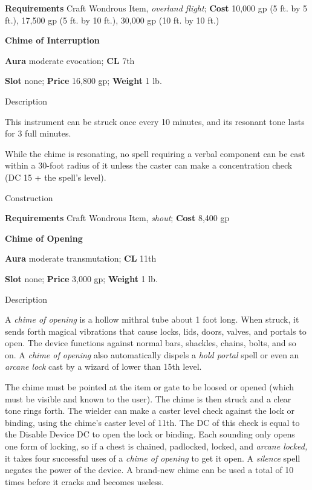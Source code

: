 \textbf{Requirements} Craft Wondrous Item, \textit{overland flight}; \textbf{Cost }10,000 gp (5 ft. by 5 ft.), 17,500 gp (5 ft. by 10 ft.), 30,000 gp (10 ft. by 10 ft.)
				
\textbf{Chime of Interruption}
				
\textbf{Aura} moderate evocation;\textbf{ CL }7th
				
\textbf{Slot} none; \textbf{Price} 16,800 gp; \textbf{Weight} 1 lb.
				
Description
				
This instrument can be struck once every 10 minutes, and its resonant tone lasts for 3 full minutes.
				
While the chime is resonating, no spell requiring a verbal component can be cast within a 30-foot radius of it unless the caster can make a concentration check (DC 15 + the spell's level). 
				
Construction
				
\textbf{Requirements} Craft Wondrous Item, \textit{shout}; \textbf{Cost }8,400 gp
				
\textbf{Chime of Opening}
				
\textbf{Aura} moderate transmutation;\textbf{ CL }11th
				
\textbf{Slot} none; \textbf{Price} 3,000 gp; \textbf{Weight} 1 lb.
				
Description
				
A \textit{chime of opening }is a hollow mithral tube about 1 foot long. When struck, it sends forth magical vibrations that cause locks, lids, doors, valves, and portals to open. The device functions against normal bars, shackles, chains, bolts, and so on. A \textit{chime of opening }also automatically dispels a \textit{hold portal }spell or even an \textit{arcane lock }cast by a wizard of lower than 15th level.
				
The chime must be pointed at the item or gate to be loosed or opened (which must be visible and known to the user). The chime is then struck and a clear tone rings forth. The wielder can make a caster level check against the lock or binding, using the chime's caster level of 11th. The DC of this check is equal to the Disable Device DC to open the lock or binding. Each sounding only opens one form of locking, so if a chest is chained, padlocked, locked, and \textit{arcane locked, }it takes four successful uses of a \textit{chime of opening }to get it open. A \textit{silence }spell negates the power of the device. A brand-new chime can be used a total of 10 times before it cracks and becomes useless. 
				

